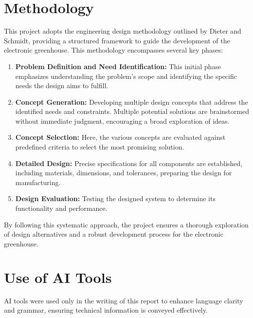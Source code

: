 \section{Methodology}

This project adopts the engineering design methodology outlined by Dieter and Schmidt, providing a structured framework to guide the development of the electronic greenhouse. \citep{Dieter} This methodology encompasses several key phases:

\begin{enumerate}
    \item \textbf{Problem Definition and Need Identification:} This initial phase emphasizes understanding the problem's scope and identifying the specific needs the design aims to fulfill.
    
    \item \textbf{Concept Generation:} Developing multiple design concepts that address the identified needs and constraints. Multiple potential solutions are brainstormed without immediate judgment, encouraging a broad exploration of ideas.
    
    \item \textbf{Concept Selection:} Here, the various concepts are evaluated against predefined criteria to select the most promising solution.
    
    \item \textbf{Detailed Design:} Precise specifications for all components are established, including materials, dimensions, and tolerances, preparing the design for manufacturing.
    
    \item \textbf{Design Evaluation:} Testing the designed system to determine its functionality and performance.
\end{enumerate} By following this systematic approach, the project ensures a thorough exploration of design alternatives and a robust development process for the electronic greenhouse.

\section{Use of AI Tools}

AI tools were used only in the writing of this report to enhance language clarity and grammar, ensuring technical information is conveyed effectively.